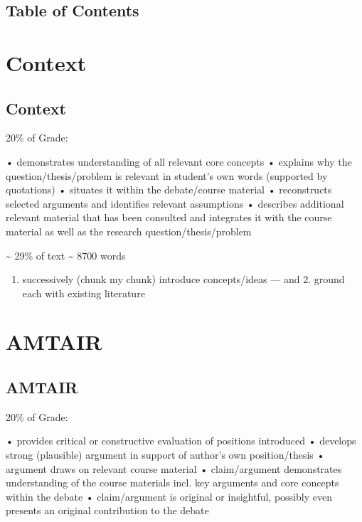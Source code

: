 \documentclass[12pt,a4paper]{report}      %
\providecommand{\tightlist}{%
  \setlength{\itemsep}{0pt}\setlength{\parskip}{0pt}}
\begin{document}
\section{Table of Contents}\label{table-of-contents}


\chapter{Context}\label{context}

\section{Context}\label{context-1}

20\% of Grade:

• demonstrates understanding of all relevant core concepts • explains
why the question/thesis/problem is relevant in student's own words
(supported by quotations) • situates it within the debate/course
material • reconstructs selected arguments and identifies relevant
assumptions • describes additional relevant material that has been
consulted and integrates it with the course material as well as the
research question/thesis/problem

\textasciitilde{} 29\% of text \textasciitilde{} 8700 words

\begin{enumerate}
\def\labelenumi{\arabic{enumi}.}
\tightlist
\item
  successively (chunk my chunk) introduce concepts/ideas --- and 2.
  ground each with existing literature
\end{enumerate}


\chapter{AMTAIR}\label{amtair}

\section{AMTAIR}\label{amtair-1}

20\% of Grade:

• provides critical or constructive evaluation of positions introduced •
develops strong (plausible) argument in support of author's own
position/thesis • argument draws on relevant course material •
claim/argument demonstrates understanding of the course materials incl.
key arguments and core concepts within the debate • claim/argument is
original or insightful, possibly even presents an original contribution
to the debate
\end{document}
